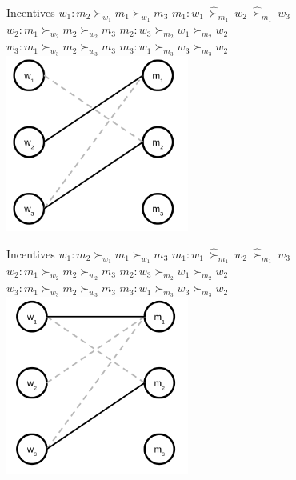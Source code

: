 \begin{frame}{Incentives}
    $w_1: m_2 \succ_{w_1} m_1 \succ_{w_1} m_3$ \tab $m_1: w_1 \ \hat{\succ}_{m_1} \ w_2 \ \hat{\succ}_{m_1} \ w_3$ \\
    $w_2: m_1 \succ_{w_2} m_2 \succ_{w_2} m_3$ \tab $m_2: w_3 \succ_{m_2} w_1 \succ_{m_2} w_2$ \\
    $w_3: m_1 \succ_{w_3} m_2 \succ_{w_3} m_3$ \tab $m_3: w_1 \succ_{m_3} w_3 \succ_{m_3} w_2$ \\
    \centering
    \includegraphics[width=6cm]{img/matching/dai4.png}
\end{frame}

\begin{frame}{Incentives}
    $w_1: m_2 \succ_{w_1} m_1 \succ_{w_1} m_3$ \tab $m_1: w_1 \ \hat{\succ}_{m_1} \ w_2 \ \hat{\succ}_{m_1} \ w_3$ \\
    $w_2: m_1 \succ_{w_2} m_2 \succ_{w_2} m_3$ \tab $m_2: w_3 \succ_{m_2} w_1 \succ_{m_2} w_2$ \\
    $w_3: m_1 \succ_{w_3} m_2 \succ_{w_3} m_3$ \tab $m_3: w_1 \succ_{m_3} w_3 \succ_{m_3} w_2$ \\
    \centering
    \includegraphics[width=6cm]{img/matching/dai5.png}
\end{frame}


